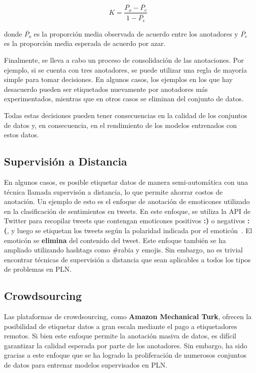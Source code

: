 \[
K = \frac{\overline{P_o} - \overline{P_e}}{1 - \overline{P_e}}
\]

donde \(\overline{P_o}\) es la proporción media observada de acuerdo entre los anotadores y \(\overline{P_e}\) es la proporción media esperada de acuerdo por azar.

Finalmente, se lleva a cabo un proceso de consolidación de las anotaciones. Por ejemplo, si se cuenta con tres anotadores, se puede utilizar una regla de mayoría simple para tomar decisiones. En algunos casos, los ejemplos en los que hay desacuerdo pueden ser etiquetados nuevamente por anotadores más experimentados, mientras que en otros casos se eliminan del conjunto de datos.

Todas estas decisiones pueden tener consecuencias en la calidad de los conjuntos de datos y, en consecuencia, en el rendimiento de los modelos entrenados con estos datos.


\subsection{Supervisión a Distancia}

En algunos casos, es posible etiquetar datos de manera semi-automática con una técnica llamada supervisón a distancia, lo que permite ahorrar costos de anotación. Un ejemplo de esto es el enfoque de anotación de emoticones utilizado en la clasificación de sentimientos en tweets. En este enfoque, se utiliza la API de Twitter para recopilar tweets que contengan emoticones positivos \textcolor[rgb]{0.00,0.00,1.00}{\textbf{:)}} o negativos \textcolor[rgb]{1.00,0.00,0.00}{\textbf{:(}}, y luego se etiquetan los tweets según la polaridad indicada por el emoticón~\cite{Read2005}. El emoticón se \textbf{elimina} del contenido del tweet. Este enfoque también se ha ampliado utilizando hashtags como \#rabia y emojis. Sin embargo, no es trivial encontrar técnicas de supervisión a distancia que sean aplicables a todos los tipos de problemas en PLN.

\subsection{Crowdsourcing}
Las plataformas de crowdsourcing, como \textbf{Amazon Mechanical Turk}, ofrecen la posibilidad de etiquetar datos a gran escala mediante el pago a etiquetadores remotos. Si bien este enfoque permite la anotación masiva de datos, es difícil garantizar la calidad esperada por parte de los anotadores. Sin embargo, ha sido gracias a este enfoque que se ha logrado la proliferación de numerosos conjuntos de datos para entrenar modelos supervisados en PLN.

